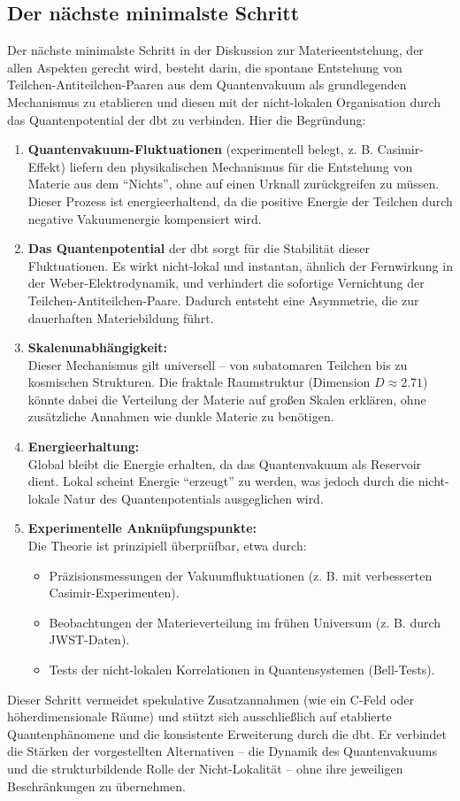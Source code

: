 \subsection{Der nächste minimalste Schritt}
Der nächste minimalste Schritt in der Diskussion zur Materieentstehung, der allen Aspekten gerecht wird, besteht darin, die spontane Entstehung von Teilchen-Antiteilchen-Paaren aus dem
Quantenvakuum als grundlegenden Mechanismus zu etablieren und diesen mit der nicht-lokalen Organisation durch das Quantenpotential der \gls{dbt} zu verbinden. Hier die Begründung:
\begin{enumerate}
    \item \textbf{Quantenvakuum-Fluktuationen} (experimentell belegt, z. B. Casimir-Effekt) liefern den physikalischen Mechanismus für die Entstehung von Materie aus dem \enquote{Nichts}, ohne auf einen Urknall zurückgreifen zu müssen. Dieser Prozess ist energieerhaltend, da die positive Energie der Teilchen durch negative Vakuumenergie kompensiert wird.
    \item \textbf{Das Quantenpotential} der \gls{dbt} sorgt für die Stabilität dieser Fluktuationen. Es wirkt nicht-lokal und instantan, ähnlich der Fernwirkung in der Weber-Elektrodynamik, und verhindert die sofortige Vernichtung der Teilchen-Antiteilchen-Paare. Dadurch entsteht eine Asymmetrie, die zur dauerhaften Materiebildung führt.
    \item \textbf{Skalenunabhängigkeit:}\\Dieser Mechanismus gilt universell – von subatomaren Teilchen bis zu kosmischen Strukturen. Die fraktale Raumstruktur (Dimension $D \approx 2.71$) könnte dabei die Verteilung der Materie auf großen Skalen erklären, ohne zusätzliche Annahmen wie dunkle Materie zu benötigen.
    \item \textbf{Energieerhaltung:}\\Global bleibt die Energie erhalten, da das Quantenvakuum als Reservoir dient. Lokal scheint Energie \enquote{erzeugt} zu werden, was jedoch durch die nicht-lokale Natur des Quantenpotentials ausgeglichen wird.
    \item \textbf{Experimentelle Anknüpfungspunkte:}\\Die Theorie ist prinzipiell überprüfbar, etwa durch:
    \begin{itemize}
        \item Präzisionsmessungen der Vakuumfluktuationen (z. B. mit verbesserten Casimir-Experimenten).
        \item Beobachtungen der Materieverteilung im frühen Universum (z. B. durch JWST-Daten).
        \item Tests der nicht-lokalen Korrelationen in Quantensystemen (Bell-Tests).
    \end{itemize}
\end{enumerate}
Dieser Schritt vermeidet spekulative Zusatzannahmen (wie ein C-Feld oder höherdimensionale Räume) und stützt sich ausschließlich auf etablierte Quantenphänomene und die konsistente Erweiterung
durch die \gls{dbt}. Er verbindet die Stärken der vorgestellten Alternativen – die Dynamik des Quantenvakuums und die strukturbildende Rolle der Nicht-Lokalität – ohne ihre jeweiligen
Beschränkungen zu übernehmen.

